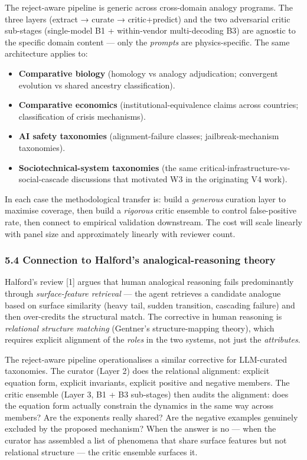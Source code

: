 \documentclass[
  letterpaper,
  11pt]{article}
\providecommand{\tightlist}{%
  \setlength{\itemsep}{0pt}\setlength{\parskip}{0pt}}
\begin{document}
The reject-aware pipeline is generic across cross-domain analogy
programs. The three layers (extract → curate → critic+predict) and the
two adversarial critic sub-stages (single-model B1 + within-vendor
multi-decoding B3) are agnostic to the specific domain content --- only
the \emph{prompts} are physics-specific. The same architecture applies
to:

\begin{itemize}
\tightlist
\item
  \textbf{Comparative biology} (homology vs analogy adjudication;
  convergent evolution vs shared ancestry classification).
\item
  \textbf{Comparative economics} (institutional-equivalence claims
  across countries; classification of crisis mechanisms).
\item
  \textbf{AI safety taxonomies} (alignment-failure classes;
  jailbreak-mechanism taxonomies).
\item
  \textbf{Sociotechnical-system taxonomies} (the same
  critical-infrastructure-vs-social-cascade discussions that motivated
  W3 in the originating V4 work).
\end{itemize}

In each case the methodological transfer is: build a \emph{generous}
curation layer to maximise coverage, then build a \emph{rigorous} critic
ensemble to control false-positive rate, then connect to empirical
validation downstream. The cost will scale linearly with panel size and
approximately linearly with reviewer count.

\subsubsection{5.4 Connection to Halford's analogical-reasoning
theory}\label{connection-to-halfords-analogical-reasoning-theory}

Halford's review {[}1{]} argues that human analogical reasoning fails
predominantly through \emph{surface-feature retrieval} --- the agent
retrieves a candidate analogue based on surface similarity (heavy tail,
sudden transition, cascading failure) and then over-credits the
structural match. The corrective in human reasoning is \emph{relational
structure matching} (Gentner's structure-mapping theory), which requires
explicit alignment of the \emph{roles} in the two systems, not just the
\emph{attributes}.

The reject-aware pipeline operationalises a similar corrective for
LLM-curated taxonomies. The curator (Layer 2) does the relational
alignment: explicit equation form, explicit invariants, explicit
positive and negative members. The critic ensemble (Layer 3, B1 + B3
sub-stages) then audits the alignment: does the equation form actually
constrain the dynamics in the same way across members? Are the exponents
really shared? Are the negative examples genuinely excluded by the
proposed mechanism? When the answer is no --- when the curator has
assembled a list of phenomena that share surface features but not
relational structure --- the critic ensemble surfaces it.
\end{document}
